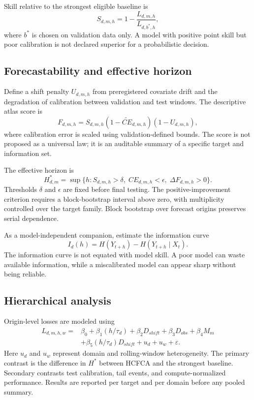 \documentclass[conference]{IEEEtran}
\begin{document}
Skill relative to the strongest eligible baseline is
\begin{equation}
 S_{d,m,h}=1-\frac{L_{d,m,h}}{L_{d,b^*,h}},
\end{equation}
where $b^*$ is chosen on validation data only. A model with positive point skill but poor calibration is not declared superior for a probabilistic decision.

\subsection{Forecastability and effective horizon}
Define a shift penalty $U_{d,m,h}$ from preregistered covariate drift and the degradation of calibration between validation and test windows. The descriptive atlas score is
\begin{equation}
 F_{d,m,h}=S_{d,m,h}(1-\widetilde{CE}_{d,m,h})(1-U_{d,m,h}),
\end{equation}
where calibration error is scaled using validation-defined bounds. The score is not proposed as a universal law; it is an auditable summary of a specific target and information set.

The effective horizon is
\begin{equation}
 H^*_{d,m}=\sup\{h:S_{d,m,h}>\delta,\;CE_{d,m,h}<\epsilon,\;\Delta F_{d,m,h}>0\}.
\end{equation}
Thresholds $\delta$ and $\epsilon$ are fixed before final testing. The positive-improvement criterion requires a block-bootstrap interval above zero, with multiplicity controlled over the target family. Block bootstrap over forecast origins preserves serial dependence.

As a model-independent companion, estimate the information curve
\begin{equation}
 I_d(h)=H(Y_{t+h})-H(Y_{t+h}\mid X_t).
\end{equation}
The information curve is not equated with model skill. A poor model can waste available information, while a miscalibrated model can appear sharp without being reliable.

\subsection{Hierarchical analysis}
Origin-level losses are modeled using
\begin{equation}
\begin{split}
 L_{d,m,h,w}={}&\beta_0+\beta_1(h/\tau_d)+\beta_2D_{shift}+\beta_3D_{obs}+\beta_4M_m\\
 &+\beta_5(h/\tau_d)D_{shift}+u_d+u_w+\varepsilon.
\end{split}
\end{equation}
Here $u_d$ and $u_w$ represent domain and rolling-window heterogeneity. The primary contrast is the difference in $H^*$ between HCFCA and the strongest baseline. Secondary contrasts test calibration, tail events, and compute-normalized performance. Results are reported per target and per domain before any pooled summary.
\end{document}
